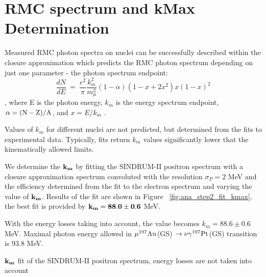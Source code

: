 \newpage
\section {RMC spectrum and kMax Determination}

Measured RMC photon spectra on nuclei can be successfully described within 
the closure approximation which predicts the RMC photon spectrum depending
on just one parameter - the photon spectrum endpoint:
$$
    \frac{dN}{dE} ~=~ \frac{e^2}{\pi} \frac{k_m^2}{ m_{\mu}^2} (1 - \alpha) (1-x+2x^2)x(1-x)^2
$$
, where E is the photon energy, $k_m$ is the energy spectrum endpoint, $\rm \alpha = (N-Z)/A$,
and $x = E/k_m$ \cite{Christillin_1980}.

Values of $k_m$ for different nuclei are not predicted, but determined from the fits
to experimental data. Typically, fits return $k_m$ values significantly lower that
the kinematically allowed limits. 

We determine the $\bf k_m$ by fitting the SINDRUM-II positron spectrum with a closure approximation spectrum convoluted with the resolution $\sigma_P = 2$ MeV and the
efficiency determined from the fit to the electron spectrum and varying the value
of $\bf k_m$. Results of the fit are shown in Figure ~\ref{fig:ana_step2_fit_kmax},
the best fit is provided by $\bf k_m = 88.0 \pm 0.6$ MeV.

With the energy losses taking into account, the value becomes  $k_m = 88.6 \pm 0.6$ MeV.
Maximal photon energy allowed in  $\mu \mbox{$\rm ^{197}Au$}$(GS) $\rm \rightarrow \nu \gamma ^{197}Pt$(GS)
transition is 93.8 MeV.

\vspace{0.1in}
 {
  \label{fig:ana_step2_fit_kmax}
  $\bf k_m$ fit of the SINDRUM-II positron spectrum, energy losses are not
  taken into account
}
\vspace{0.1in}


